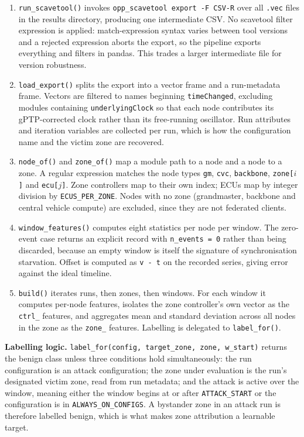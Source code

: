 \begin{enumerate}
  \item \texttt{run\_scavetool()} invokes \texttt{opp\_scavetool export -F CSV-R} over
        all \texttt{.vec} files in the results directory, producing one intermediate
        CSV. No scavetool filter expression is applied: match-expression syntax varies
        between tool versions and a rejected expression aborts the export, so the
        pipeline exports everything and filters in pandas. This trades a larger
        intermediate file for version robustness.
  \item \texttt{load\_export()} splits the export into a vector frame and a run-metadata
        frame. Vectors are filtered to names beginning \texttt{timeChanged}, excluding
        modules containing \texttt{underlyingClock} so that each node contributes its
        gPTP-corrected clock rather than its free-running oscillator. Run attributes
        and iteration variables are collected per run, which is how the configuration
        name and the victim zone are recovered.
  \item \texttt{node\_of()} and \texttt{zone\_of()} map a module path to a node and a
        node to a zone. A regular expression matches the node types
        \texttt{gm}, \texttt{cvc}, \texttt{backbone}, \texttt{zone[$i$]} and
        \texttt{ecu[$j$]}. Zone controllers map to their own index; ECUs map by integer
        division by \texttt{ECUS\_PER\_ZONE}. Nodes with no zone (grandmaster,
        backbone and central vehicle compute) are excluded, since they are not
        federated clients.
  \item \texttt{window\_features()} computes eight statistics per node per window. The
        zero-event case returns an explicit record with \texttt{n\_events = 0} rather
        than being discarded, because an empty window is itself the signature of
        synchronisation starvation. Offset is computed as \texttt{v - t} on the recorded
        series, giving error against the ideal timeline.
  \item \texttt{build()} iterates runs, then zones, then windows. For each window it
        computes per-node features, isolates the zone controller's own vector as the
        \texttt{ctrl\_} features, and aggregates mean and standard deviation across all
        nodes in the zone as the \texttt{zone\_} features. Labelling is delegated to
        \texttt{label\_for()}.
\end{enumerate}

\textbf{Labelling logic.} \texttt{label\_for(config, target\_zone, zone, w\_start)}
returns the benign class unless three conditions hold simultaneously: the run
configuration is an attack configuration; the zone under evaluation is the run's
designated victim zone, read from run metadata; and the attack is active over the
window, meaning either the window begins at or after \texttt{ATTACK\_START} or the
configuration is in \texttt{ALWAYS\_ON\_CONFIGS}. A bystander zone in an attack run is
therefore labelled benign, which is what makes zone attribution a learnable target.

